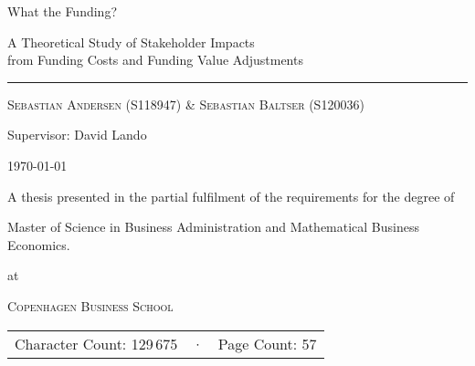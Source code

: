 \documentclass[main.tex]{subfiles}
\begin{document}
	\begin{titlepage}
		\centering
		\vspace{5cm}
		{\Huge What the Funding? \par}
		{\Large A Theoretical Study of Stakeholder Impacts \\ 
		from Funding Costs and Funding Value Adjustments \par}
		\rule{\textwidth}{1px}\par
		{\scshape\large Sebastian Andersen {\small(S118947)} \& Sebastian Baltser {\small(S120036)}\par}
		
		Supervisor: David Lando \\
		
		\vfill
		
		{\Large \today \par}		
		{A thesis presented in the partial fulfilment
		of the requirements for the degree of \\}
		{\Large Master of Science in Business Administration and Mathematical Business Economics. \par}
		at \par 
		{\scshape\LARGE Copenhagen Business School\par}
		\vspace{0.5cm}
		\begin{tabular}{>{\raggedleft\arraybackslash}m{5cm}>{\centering\arraybackslash}m{0.75cm}>{\raggedright\arraybackslash}m{5cm}}
		Character Count: 129\,675 & · & Page Count: 57 \\
		\end{tabular}
		
		\thispagestyle{empty}
	\end{titlepage}
\end{document}

